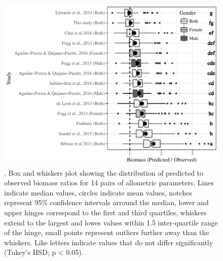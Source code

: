 \documentclass[12pt,]{article}
\begin{document}
\clearpage

\begin{figure}[htbp]
\centering
\includegraphics{Manuscript_files/figure-latex/unnamed-chunk-10-1.pdf}
\caption{. Box and whiskers plot showing the distribution of predicted
to observed biomass ratios for 14 pairs of allometric parameters. Lines
indicate median values, circles indicate mean values, notches represent
95\% confidence intervals arround the median, lower and upper hinges
correspond to the first and third quartiles, whiskers extend to the
largest and lowes values within 1.5 inter-quartile range of the hinge,
small points represent outliers further away than the whiskers. Like
letters indicate values that do not differ significantly (Tukey's HSD; p
\textless{} 0.05).}
\end{figure}
\end{document}
